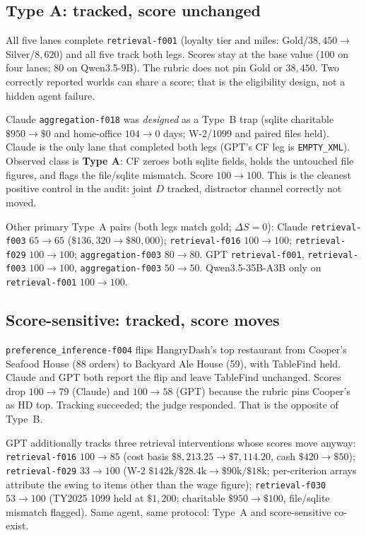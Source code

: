\documentclass[11pt]{article}
\newcommand{\task}[1]{\texttt{#1}}
\begin{document}
\subsection{Type A: tracked, score unchanged}
\label{sec:type-a}

All five lanes complete \task{retrieval-f001} (loyalty tier and miles:
Gold/$38{,}450\to$Silver/$8{,}620$) and all five track both legs.
Scores stay at the base value (100 on four lanes; 80 on Qwen3.5-9B).
The rubric does not pin Gold or $38{,}450$. Two correctly reported worlds
can share a score; that is the eligibility design, not a hidden agent
failure.

Claude \task{aggregation-f018} was \emph{designed} as a Type~B trap
(sqlite charitable $\$950\to\$0$ and home-office $104\to 0$ days; W-2/1099
and paired files held). Claude is the only lane that completed both
legs (GPT's CF leg is \texttt{EMPTY\_XML}). Observed class is
\textbf{Type A}: CF zeroes both sqlite fields, holds the untouched file
figures, and flags the file/sqlite mismatch. Score $100\to 100$. This is
the cleanest positive control in the audit: joint $D$ tracked, distractor
channel correctly not moved.

Other primary Type~A pairs (both legs match gold; $\Delta S=0$): Claude
\task{retrieval-f003} $65\to 65$ ($\$136{,}320\to\$80{,}000$);
\task{retrieval-f016} $100\to 100$; \task{retrieval-f029} $100\to 100$;
\task{aggregation-f003} $80\to 80$. GPT \task{retrieval-f001},
\task{retrieval-f003} $100\to 100$, \task{aggregation-f003} $50\to 50$.
Qwen3.5-35B-A3B only on \task{retrieval-f001} $100\to 100$.

\subsection{Score-sensitive: tracked, score moves}
\label{sec:score-sensitive}

\task{preference\_inference-f004} flips HangryDash's top restaurant from
Cooper's Seafood House (88 orders) to Backyard Ale House (59), with
TableFind held. Claude and GPT both report the flip and leave TableFind
unchanged. Scores drop $100\to 79$ (Claude) and $100\to 58$ (GPT) because
the rubric pins Cooper's as HD top. Tracking succeeded; the judge
responded. That is the opposite of Type~B.

GPT additionally tracks three retrieval interventions whose scores move
anyway: \task{retrieval-f016} $100\to 85$ (cost basis
$\$8{,}213.25\to\$7{,}114.20$, cash $\$420\to\$50$);
\task{retrieval-f029} $33\to 100$ (W-2 $\$142\mathrm{k}/\$28.4\mathrm{k}
\to\$90\mathrm{k}/\$18\mathrm{k}$; per-criterion arrays attribute the
swing to items other than the wage figure);
\task{retrieval-f030} $53\to 100$ (TY2025 1099 held at $\$1{,}200$;
charitable $\$950\to\$100$, file/sqlite mismatch flagged). Same agent,
same protocol: Type~A and score-sensitive co-exist.
\end{document}
